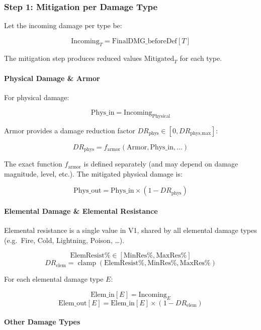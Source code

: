 \subsubsection{Step 1: Mitigation per Damage Type}

Let the incoming damage per type be:

\[
\text{Incoming}_T = \text{FinalDMG\_beforeDef}[T]
\]

The mitigation step produces reduced values $\text{Mitigated}_T$ for each type.

\paragraph{Physical Damage \& Armor}

For physical damage:

\[
\text{Phys\_in} = \text{Incoming}_{\text{Physical}}
\]

Armor provides a damage reduction factor $DR_{\text{phys}} \in [0, DR_{\text{phys,max}}]$:

\[
DR_{\text{phys}} = f_{\text{armor}}(\text{Armor}, \text{Phys\_in}, \dots)
\]

The exact function $f_{\text{armor}}$ is defined separately (and may depend on
damage magnitude, level, etc.). The mitigated physical damage is:

\[
\text{Phys\_out} = \text{Phys\_in} \times (1 - DR_{\text{phys}})
\]

\paragraph{Elemental Damage \& Elemental Resistance}

Elemental resistance is a single value in V1, shared by all elemental damage types
(e.g.\ Fire, Cold, Lightning, Poison, \dots).

\[
\text{ElemResist\%} \in [\text{MinRes\%}, \text{MaxRes\%}]
\]
\[
DR_{\text{elem}} =
\operatorname{clamp}(\text{ElemResist\%}, \text{MinRes\%}, \text{MaxRes\%})
\]

For each elemental damage type $E$:

\[
\text{Elem\_in}[E]  = \text{Incoming}_E
\]
\[
\text{Elem\_out}[E] = \text{Elem\_in}[E] \times (1 - DR_{\text{elem}})
\]

\paragraph{Other Damage Types}

